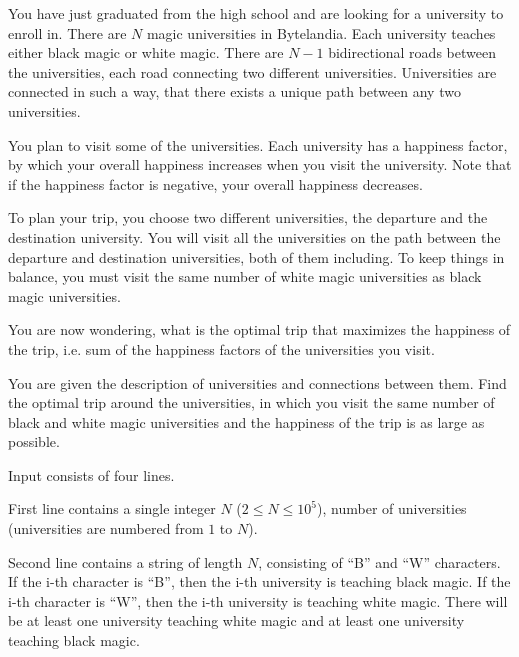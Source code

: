 





You have just graduated from the high school and are looking for a university to enroll in.
There are $N$ magic universities in Bytelandia. Each university teaches either
black magic or white magic. There are $N-1$ bidirectional roads between the universities, each road
connecting two different universities. Universities are connected in such a way,
that there exists a unique path between any two universities.

You plan to visit some of the universities.
Each university has a happiness factor, by which your overall happiness increases
when you visit the university. Note that if the happiness factor is negative, your overall
happiness decreases.

To plan your trip, you choose two different universities,
the departure and the destination university. You will visit all the universities
on the path between the departure and destination universities, both of them including.
To keep things in balance, you must visit the same number of white magic universities as black magic universities.

You are now wondering, what is the optimal trip that maximizes the happiness of the trip,
i.e. sum of the happiness factors of the universities you visit.


You are given the description of universities and connections between them.
Find the optimal trip around the universities, in which you visit
the same number of black and white magic universities and the happiness of the trip
is as large as possible.


Input consists of four lines.

First line contains a single integer $N$ ($2 \leq N \leq 10^5$), number of universities (universities are numbered from $1$ to $N$).

Second line contains a string of length $N$, consisting of ``B'' and ``W'' characters.
If the i-th character is ``B'', then the i-th university is teaching black magic.
If the i-th character is ``W'', then the i-th university is teaching white magic.
There will be at least one university teaching white magic and at least one university teaching black magic.

